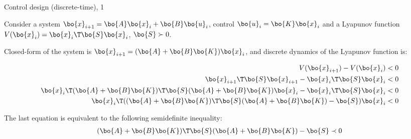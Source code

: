 \documentclass{beamer}
\begin{document}
\begin{frame}{Control design (discrete-time), 1}
	\begin{flushleft}
		
		Consider a system $\bo{x}_{i+1} = \bo{A}\bo{x}_i + \bo{B}\bo{u}_i$, control $\bo{u}_i = \bo{K}\bo{x}_i$ and a Lyapunov function $V(\bo{x}_i) = \bo{x}_i\T \bo{S} \bo{x}_i$, $\bo{S} \succ 0$.
		
		\bigskip
		
		Closed-form of the system is $\bo{x}_{i+1} = (\bo{A} + \bo{B}\bo{K})\bo{x}_i$, and discrete dynamics of the Lyapunov function is:
		
		\begin{align}
			V(\bo{x}_{i+1}) - V(\bo{x}_i) <0 
			\\
			\bo{x}_{i+1}\T \bo{S} \bo{x}_{i+1} - \bo{x}_i\T \bo{S} \bo{x}_i < 0
			\\
			\bo{x}_i\T(\bo{A} + \bo{B}\bo{K})\T \bo{S} (\bo{A} + \bo{B}\bo{K})\bo{x}_i - \bo{x}_i\T \bo{S} \bo{x}_i < 0
			\\
			\bo{x}_i\T((\bo{A} + \bo{B}\bo{K})\T \bo{S} (\bo{A} + \bo{B}\bo{K}) - \bo{S})\bo{x}_i < 0
		\end{align}
		
		The last equation is equivalent to the following semidefinite inequality:
		\begin{align}
		(\bo{A} + \bo{B}\bo{K})\T \bo{S} (\bo{A} + \bo{B}\bo{K}) - \bo{S} \prec 0
		\end{align}
		
		
	\end{flushleft}
\end{frame}
\end{document}
